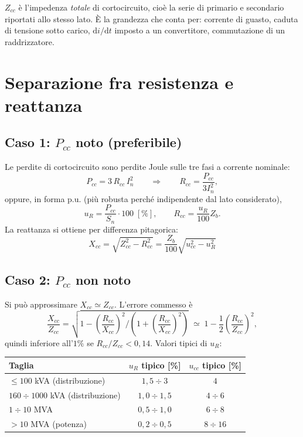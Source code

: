 \documentclass[11pt,a4paper]{article}
\begin{document}
$Z_{cc}$ è l'impedenza \emph{totale} di cortocircuito, cioè la serie di primario e
secondario riportati allo stesso lato. È la grandezza che conta per: corrente di guasto,
caduta di tensione sotto carico, $\mathrm{d}i/\mathrm{d}t$ imposto a un convertitore,
commutazione di un raddrizzatore.

\section{Separazione fra resistenza e reattanza}

\subsection{Caso 1: $P_{cc}$ noto (preferibile)}

Le perdite di cortocircuito sono perdite Joule sulle tre fasi a corrente nominale:
\begin{equation}
P_{cc} = 3\,R_{cc}\,I_n^2
\qquad\Longrightarrow\qquad
R_{cc} = \frac{P_{cc}}{3 I_n^2},
\label{eq:Rcc}
\end{equation}
oppure, in forma p.u. (più robusta perché indipendente dal lato considerato),
\begin{equation}
u_R = \frac{P_{cc}}{S_n}\cdot 100 \;[\%],
\qquad R_{cc} = \frac{u_R}{100} Z_b .
\end{equation}
La reattanza si ottiene per differenza pitagorica:
\begin{equation}
\boxed{\;X_{cc} = \sqrt{Z_{cc}^2 - R_{cc}^2}
= \frac{Z_b}{100}\sqrt{u_{cc}^2 - u_R^2}\;}
\label{eq:Xcc}
\end{equation}

\subsection{Caso 2: $P_{cc}$ non noto}

Si può approssimare $X_{cc}\simeq Z_{cc}$. L'errore commesso è
\begin{equation}
\frac{X_{cc}}{Z_{cc}} = \sqrt{1-\left(\frac{R_{cc}}{X_{cc}}\right)^2\!\!\Big/\!\left(1+\left(\frac{R_{cc}}{X_{cc}}\right)^2\right)}
\;\simeq\; 1-\frac{1}{2}\left(\frac{R_{cc}}{Z_{cc}}\right)^2 ,
\end{equation}
quindi inferiore all'$1\%$ se $R_{cc}/Z_{cc}<0{,}14$. Valori tipici di $u_R$:

\begin{center}
\begin{tabular}{lcc}
\toprule
Taglia & $u_R$ tipico [\%] & $u_{cc}$ tipico [\%] \\
\midrule
$\le 100$ kVA (distribuzione)      & $1{,}5\div3$   & $4$ \\
$160\div1000$ kVA (distribuzione)  & $1{,}0\div1{,}5$ & $4\div6$ \\
$1\div10$ MVA                      & $0{,}5\div1{,}0$ & $6\div8$ \\
$>10$ MVA (potenza)                & $0{,}2\div0{,}5$ & $8\div16$ \\
\bottomrule
\end{tabular}
\end{center}
\end{document}
